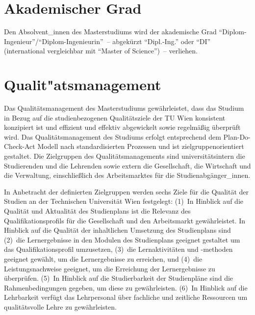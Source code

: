 \section{Akademischer Grad}\label{sec:AG}

Den Absolvent\_innen 
des Masterstudiums \emph{} wird der akademische Grad
"`Diplom-Ingenieur"'/"`Diplom-Ingenieurin"'~-- abgekürzt
"`Dipl.-Ing."' oder "`DI"' (international vergleichbar mit 
"`Master of Science"')~-- verliehen.

\section{Qualit"atsmanagement}\label{sec:IQ}

Das Qualitätsmanagement des Masterstudiums \emph{}
gewährleistet, dass das Studium in Bezug auf die studienbezogenen
Qualitätsziele der TU Wien konsistent konzipiert ist und effizient und
effektiv abgewickelt sowie regelmäßig überprüft wird. Das
Qualitätsmanagement des Studiums erfolgt entsprechend dem
Plan-Do-Check-Act Modell nach standardisierten Prozessen und ist
zielgruppenorientiert gestaltet. Die Zielgruppen des
Qualitätsmanagements sind universitätsintern die Studierenden und die
Lehrenden sowie extern die Gesellschaft, die Wirtschaft und die
Verwaltung, einschließlich des Arbeitsmarktes für die
Studienabgänger\_innen. 
\medskip

In Anbetracht der definierten Zielgruppen werden sechs Ziele für die
Qualität der Studien an der Technischen Universität Wien festgelegt:
(1)~In Hinblick auf die Qualität und Aktualität des
Studienplans ist die Relevanz des Qualifikationsprofils für die
Gesellschaft und den Arbeitsmarkt gewährleistet. In Hinblick auf die
Qualität der inhaltlichen Umsetzung des Studienplans sind (2)~die
Lernergebnisse in den Modulen des Studienplans geeignet gestaltet um
das Qualifikationsprofil umzusetzen, (3)~die Lernaktivitäten und
-methoden geeignet gewählt, um die Lernergebnisse zu erreichen, und
(4)~die Leistungsnachweise geeignet, um die Erreichung der
Lernergebnisse zu überprüfen.  (5)~In Hinblick auf die Studierbarkeit
der Studienpläne sind die Rahmenbedingungen gegeben, um diese zu
gewährleisten.  (6)~In Hinblick auf die Lehrbarkeit verfügt das
Lehrpersonal über fachliche und zeitliche Ressourcen um qualitätsvolle
Lehre zu gewährleisten.
\medskip

